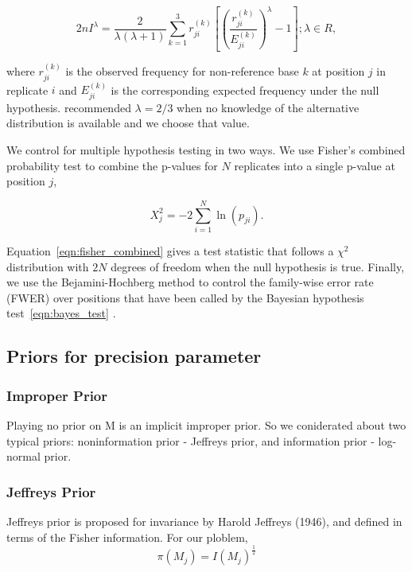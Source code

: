 \documentclass[11pt,reqno]{amsart}
\begin{document}
\begin{equation}
 2nI^\lambda = \frac{2}{\lambda(\lambda+1)}\sum_{k=1}^3 r_{ji}^{(k)} \left[\left(\frac{r_{ji}^{(k)}}{E_{ji}^{(k)}}\right)^\lambda-1\right];\lambda \in R,
\end{equation}

where $r_{ji}^{(k)}$ is the observed frequency for non-reference base $k$ at position $j$ in replicate $i$ and $E_{ji}^{(k)}$ is the corresponding expected frequency under the null hypothesis. \citet{Cressie1984} recommended $\lambda = 2/3$ when no knowledge of the alternative distribution is available and we choose that value.

We control for multiple hypothesis testing in two ways. We use Fisher's combined probability test \citep{} to combine the p-values for $N$ replicates into a single p-value at position $j$,

\begin{equation}\label{eqn:fisher_combined}
	X_j^2 = -2 \sum_{i=1}^N \ln(p_{ji}).
\end{equation}

Equation~\eqref{eqn:fisher_combined} gives a test statistic that follows a $\chi^2$ distribution with $2N$ degrees of freedom when the null hypothesis is true. Finally, we use the Bejamini-Hochberg method to control the family-wise error rate (FWER) over positions that have been called by the Bayesian hypothesis test~\eqref{eqn:bayes_test} \citep{benjamini1995controlling, efron2010large}.

\subsection{Priors for precision parameter}
\subsubsection{Improper Prior}
Playing no prior on M is an implicit improper prior. So we coniderated about two typical priors: noninformation prior - Jeffreys prior, and information prior - log-normal prior.

\subsubsection{Jeffreys Prior}
Jeffreys prior is proposed for invariance by Harold Jeffreys (1946), and defined in terms of the Fisher information. For our ploblem,
\begin{equation}\label{eqn:JefferyPrior}
\pi\left({M}_{j}\right)= I\left({M}_{j}\right)^{\frac{1}{2}}
\end{equation}
\end{document}
